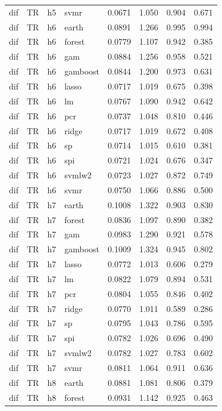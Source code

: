 \begin{ThreePartTable}
\begin{longtable}[t]{llclcccc}
dif & TR & h5 & svmr & 0.0671 & 1.050 & 0.904 & 0.671\\
\addlinespace
dif & TR & h6 & earth & 0.0891 & 1.266 & 0.995 & 0.994\\
dif & TR & h6 & forest & 0.0779 & 1.107 & 0.942 & 0.385\\
dif & TR & h6 & gam & 0.0884 & 1.256 & 0.958 & 0.521\\
dif & TR & h6 & gamboost & 0.0844 & 1.200 & 0.973 & 0.631\\
dif & TR & h6 & lasso & 0.0717 & 1.019 & 0.675 & 0.398\\
dif & TR & h6 & lm & 0.0767 & 1.090 & 0.942 & 0.642\\
dif & TR & h6 & pcr & 0.0737 & 1.048 & 0.810 & 0.446\\
dif & TR & h6 & ridge & 0.0717 & 1.019 & 0.672 & 0.408\\
dif & TR & h6 & sp & 0.0714 & 1.015 & 0.610 & 0.381\\
dif & TR & h6 & spi & 0.0721 & 1.024 & 0.676 & 0.347\\
dif & TR & h6 & svmlw2 & 0.0723 & 1.027 & 0.872 & 0.749\\
dif & TR & h6 & svmr & 0.0750 & 1.066 & 0.886 & 0.500\\
\addlinespace
dif & TR & h7 & earth & 0.1008 & 1.322 & 0.903 & 0.830\\
dif & TR & h7 & forest & 0.0836 & 1.097 & 0.890 & 0.382\\
dif & TR & h7 & gam & 0.0983 & 1.290 & 0.921 & 0.578\\
dif & TR & h7 & gamboost & 0.1009 & 1.324 & 0.945 & 0.802\\
dif & TR & h7 & lasso & 0.0772 & 1.013 & 0.606 & 0.279\\
dif & TR & h7 & lm & 0.0822 & 1.079 & 0.894 & 0.531\\
dif & TR & h7 & pcr & 0.0804 & 1.055 & 0.846 & 0.402\\
dif & TR & h7 & ridge & 0.0770 & 1.011 & 0.589 & 0.286\\
dif & TR & h7 & sp & 0.0795 & 1.043 & 0.786 & 0.595\\
dif & TR & h7 & spi & 0.0782 & 1.026 & 0.696 & 0.490\\
dif & TR & h7 & svmlw2 & 0.0782 & 1.027 & 0.783 & 0.602\\
dif & TR & h7 & svmr & 0.0811 & 1.064 & 0.911 & 0.636\\
\addlinespace
dif & TR & h8 & earth & 0.0881 & 1.081 & 0.806 & 0.379\\
dif & TR & h8 & forest & 0.0931 & 1.142 & 0.925 & 0.463\\

\end{longtable}
\end{ThreePartTable}
